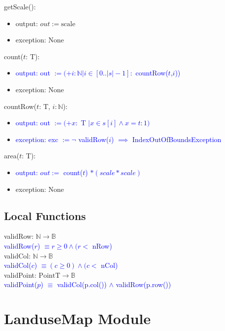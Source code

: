 \documentclass[12pt]{article}
\begin{document}
\noindent getScale():
\begin{itemize}
\item output: $out := \mbox{scale}$
\item exception: None
\end{itemize}

\noindent count($t$: T):
\begin{itemize}
\item \textcolor{blue}{output: out $:= (+i : \mathbb{N} | i \in [0..|s|-1] : $ countRow($t$,$i$))}
\item exception: None
\end{itemize}

\noindent countRow($t$: T, $i: \mathbb{N}$):
\begin{itemize}
\item \textcolor{blue}{output: out $:= (+x : $ T $| x \in s[i] \land x = t : 1)$}
\item \textcolor{blue}{exception: exc $ := \lnot$ validRow($i$) $\implies$ IndexOutOfBoundsException}
\end{itemize}

\noindent area($t$: T):
\begin{itemize}
\item \textcolor{blue}{output: $out :=$ count($t$) $ * (scale * scale)$}
\item exception: None
\end{itemize}

\subsection*{Local Functions}

\noindent validRow: $\mathbb{N} \rightarrow \mathbb{B}$\\
\noindent \textcolor{blue}{validRow($r$) $\equiv r \geq 0 \land (r < $ nRow)} \\

\noindent validCol: $\mathbb{N} \rightarrow \mathbb{B}$\\
\noindent \textcolor{blue}{validCol($c$) $\equiv (c \geq 0) \land (c < $ nCol)} \\


\noindent validPoint: $\mbox{PointT} \rightarrow \mathbb{B}$\\
\noindent \textcolor{blue}{validPoint($p$) $\equiv$ validCol(p.col()) $\land$ validRow(p.row())}


\newpage

\section* {LanduseMap Module}
\end{document}
